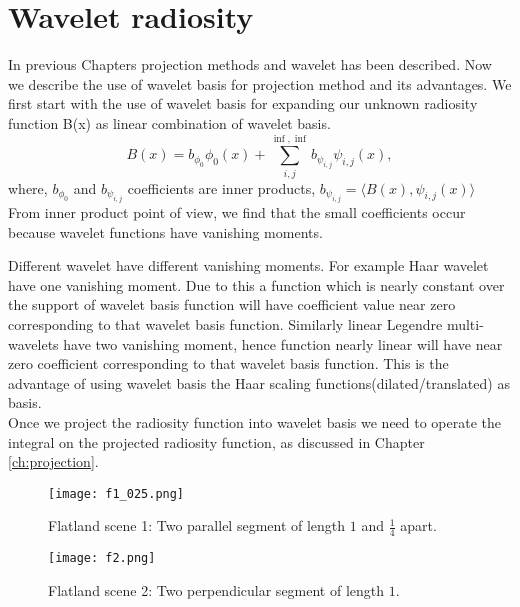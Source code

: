 \chapter{\label{ch:waveletprojection}Wavelet radiosity}
In previous Chapters projection methods and wavelet has been described. Now we describe the use of wavelet basis for projection method and its advantages. 
We first start with the use of wavelet basis for expanding our unknown radiosity function B(x) as linear combination of wavelet basis.\\
\begin{equation}
B(x) = b_{\phi_0}\phi_0(x)+\sum_{i,j}^{\inf,\inf}b_{\psi_{i,j}}\psi_{i,j}(x),
\end{equation}
where, $b_{\phi_0}$ and $b_{\psi_{i,j}}$ coefficients are inner products, 
$b_{\psi_{i,j}}=\langle B(x),\psi_{i,j}(x) \rangle $\\
From inner product point of view, we find that the small coefficients occur because wavelet functions have vanishing moments.

Different wavelet have different vanishing moments. For example Haar wavelet have one vanishing moment. Due to this a function which is nearly constant over the support of wavelet basis function will have coefficient value near zero corresponding to that wavelet basis function. Similarly linear Legendre multi-wavelets have two vanishing moment, hence function nearly linear will have near zero coefficient corresponding to that wavelet basis function. This is the advantage of using wavelet basis the Haar scaling functions(dilated/translated)  as basis.\\

Once we project the radiosity function into wavelet basis we need to operate the integral on the projected radiosity function, as discussed in Chapter \ref{ch:projection}.
\begin{figure}[tbh]
\centering{}
\captionsetup{justification=centering}
\texttt{[image: f1\_025.png]}
\caption{\label{fig:f1scene}Flatland scene 1: Two parallel segment of length $1$ and $\frac{1}{4}$ apart. }
\end{figure}

\begin{figure}[tbh]
\centering{}
\captionsetup{justification=centering}
\texttt{[image: f2.png]}
\caption{\label{fig:f2scene}Flatland scene 2: Two perpendicular segment of length $1$. }
\end{figure}

